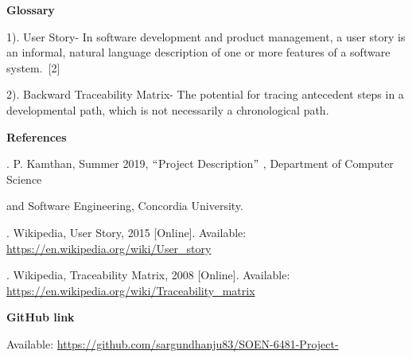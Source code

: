 \documentclass[12pt]{article}
\begin{document}
{\fontsize{14pt}{16.8pt}\selectfont \textbf{Glossary}\par}\par

1). User Story- In software development and product management, a user story is an informal, natural language description of one or more features of a software system. [2]\par

2). Backward Traceability Matrix- The potential for tracing antecedent steps in a developmental path, which is not necessarily a chronological path.\par

{\fontsize{14pt}{16.8pt}\selectfont \textbf{References}\par}\par

{\fontsize{10pt}{12.0pt}\selectfont [1]. P. Kamthan, Summer 2019, $``$Project Description$"$ , Department of Computer Science\par}\par

{\fontsize{10pt}{12.0pt}\selectfont and Software Engineering, Concordia University.\par}\par

{\fontsize{10pt}{12.0pt}\selectfont [2]. Wikipedia, User Story, 2015 [Online]. Available: \href{https://en.wikipedia.org/wiki/User_story}{https://en.wikipedia.org/wiki/User\_story}\par}\par

{\fontsize{10pt}{12.0pt}\selectfont [3]. Wikipedia, Traceability Matrix, 2008 [Online]. Available: \href{https://en.wikipedia.org/wiki/Traceability_matrix}{https://en.wikipedia.org/wiki/Traceability\_matrix}\par}\par

{\fontsize{14pt}{16.8pt}\selectfont \textbf{GitHub link}\par}\par

{\fontsize{10pt}{12.0pt}\selectfont Available: \href{https://github.com/sargundhanju83/SOEN-6481-Project-}{https://github.com/sargundhanju83/SOEN-6481-Project-}\par}\par


\vspace{\baselineskip}
\begin{justify}
 
\end{justify}\par

\tab 
\vspace{\baselineskip}
\printbibliography
\end{document}
